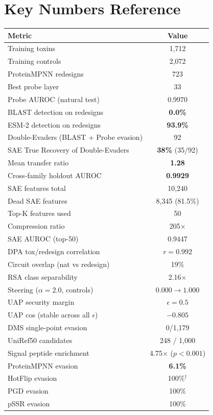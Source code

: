 \documentclass[11pt,a4paper]{article}
\begin{document}
\section{Key Numbers Reference}
\begin{table}[H]
\centering
\begin{tabular}{lc}
\toprule
\textbf{Metric} & \textbf{Value} \\
\midrule
Training toxins & 1,712 \\
Training controls & 2,072 \\
ProteinMPNN redesigns & 723 \\
Best probe layer & 33 \\
Probe AUROC (natural test) & 0.9970 \\
BLAST detection on redesigns & \textbf{0.0\%} \\
ESM-2 detection on redesigns & \textbf{93.9\%} \\
Double-Evaders (BLAST + Probe evasion) & 92 \\
SAE True Recovery of Double-Evaders & \textbf{38\%} (35/92) \\
Mean transfer ratio & \textbf{1.28} \\
Cross-family holdout AUROC & \textbf{0.9929} \\
SAE features total & 10,240 \\
Dead SAE features & 8,345 (81.5\%) \\
Top-K features used & 50 \\
Compression ratio & 205$\times$ \\
SAE AUROC (top-50) & 0.9447 \\
DPA tox/redesign correlation & \textbf{$r = 0.992$} \\
Circuit overlap (nat vs redesign) & 19\% \\
RSA class separability & 2.16$\times$ \\
Steering ($\alpha = 2.0$, controls) & $0.000 \rightarrow 1.000$ \\
UAP security margin & $\epsilon = 0.5$ \\
UAP cos (stable across all $\epsilon$) & $-0.805$ \\
DMS single-point evasion & 0/1,179 \\
UniRef50 candidates & 248 / 1,000 \\
Signal peptide enrichment & 4.75$\times$ ($p < 0.001$) \\
ProteinMPNN evasion & \textbf{6.1\%} \\
HotFlip evasion & 100\%$^\dagger$ \\
PGD evasion & 100\% \\
pSSR evasion & 100\% \\
\bottomrule
\end{tabular}
\end{table}
\end{document}
